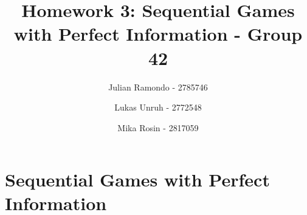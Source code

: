 \documentclass[11pt]{article}
\title{Homework 3: Sequential Games with Perfect Information - Group 42}
\author{Julian Ramondo - 2785746 \and Lukas Unruh - 2772548 \and Mika Rosin - 2817059}
\begin{document}
    \maketitle

    \setcounter{section}{2}
    \section{Sequential Games with Perfect Information}

    
    
\end{document}
